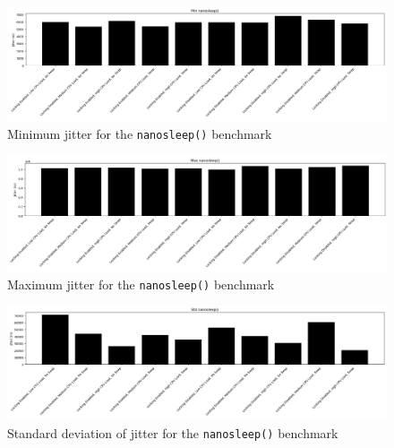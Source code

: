 \documentclass[a4paper]{article}
\begin{document}
\begin{figure}[H]
    \centering
    \includegraphics[width=\textwidth]{./images/nanosleep-min.png}
    \caption{Minimum jitter for the \texttt{nanosleep()} benchmark}
\end{figure}

\begin{figure}[H]
    \centering
    \includegraphics[width=\textwidth]{./images/nanosleep-max.png}
    \caption{Maximum jitter for the \texttt{nanosleep()} benchmark}
\end{figure}

\begin{figure}[H]
    \centering
    \includegraphics[width=\textwidth]{./images/nanosleep-std.png}
    \caption{Standard deviation of jitter for the \texttt{nanosleep()} benchmark}
\end{figure}
\end{document}
